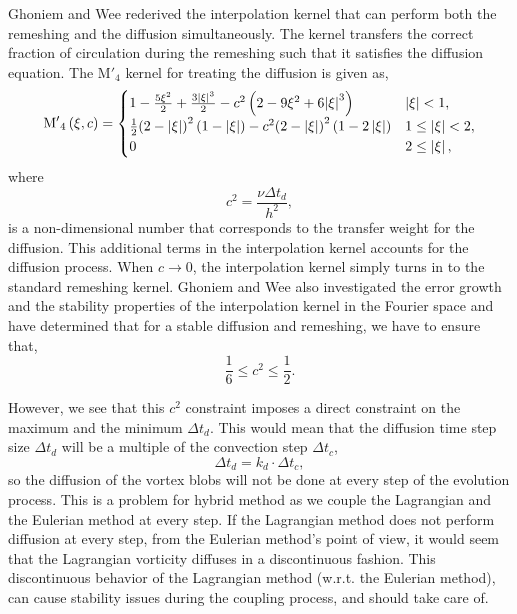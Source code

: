 Ghoniem and Wee rederived the interpolation kernel that can perform both the remeshing and the diffusion simultaneously. The kernel transfers the correct fraction of circulation during the remeshing such that it satisfies the diffusion equation. The $\mathrm{M'}_4$ kernel for treating the diffusion is given as,
	\begin{equation}
	{{{\rm{M'}}}_4}\left( {\xi ,c} \right) =
	  \begin{cases}
	   {1 - \frac{{5{\xi ^2}}}{2} + \frac{{3{{\left| \xi  \right|}^3}}}{2} - {c^2}\left( {2 - 9{\xi ^2} + 6{{\left| \xi  \right|}^3}} \right)} & {\left| \xi \right|} < 1, \\
	   \frac{1}{2}{\left( {2 - \left| \xi  \right|} \right)^2}\left( {1 - \left| \xi  \right|} \right) - {c^2}{\left( {2 - \left| \xi  \right|} \right)^2}\left( {1 - 2\left| \xi  \right|} \right) & 1 \le {\left| \xi \right|} < 2,\\
	   0 & 2 \le \left| \xi \right|,
	  \end{cases}
	\label{eq:modInterpKernel}
	\end{equation}
where 
	\begin{equation}
	c^2 = \frac{\nu \Delta t_d}{h^2},
	\label{eq:c2}
	\end{equation}
is a non-dimensional number that corresponds to the transfer weight for the diffusion. This additional terms in the interpolation kernel accounts for the diffusion process. When $c \rightarrow 0$, the interpolation kernel simply turns in to the standard remeshing kernel. Ghoniem and Wee also investigated the error growth and the stability properties of the interpolation kernel in the Fourier space and have determined that for a stable diffusion and remeshing, we have to ensure that,
	\begin{equation}
	\frac{1}{6} \le c^2 \le \frac{1}{2}.
	\label{eq:c2stability}
	\end{equation}

However, we see that this $c^2$ constraint imposes a direct constraint on the maximum and the minimum $\Delta t_d$. This would mean that the diffusion time step size $\Delta t_d$ will be a multiple of the convection step $\Delta t_c$,
	\begin{equation}
	\Delta t_d = k_d \cdot \Delta t_c,
	\end{equation}
so the diffusion of the vortex blobs will not be done at every step of the evolution process. This is a problem for hybrid method as we couple the Lagrangian and the Eulerian method at every step. If the Lagrangian method does not perform diffusion at every step, from the Eulerian method's point of view, it would seem that the Lagrangian vorticity diffuses in a discontinuous fashion. This discontinuous behavior of the Lagrangian method (w.r.t. the Eulerian method), can cause stability issues during the coupling process, and should take care of.

